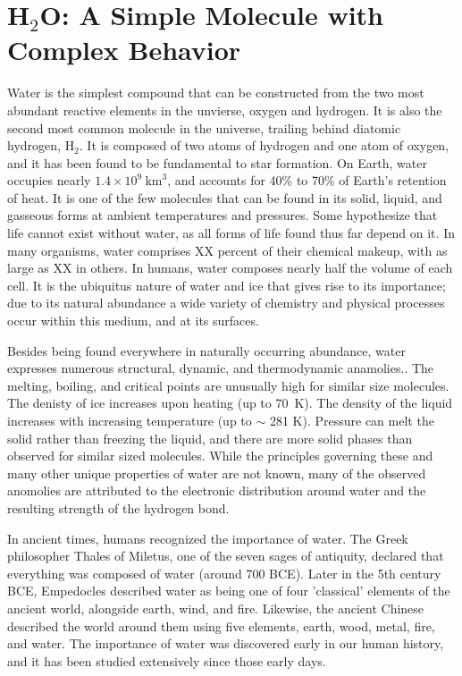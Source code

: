 \section{H$_2$O: A Simple Molecule with Complex Behavior}
Water is the simplest compound that can be constructed from the two
most abundant reactive elements in the unvierse, oxygen and
hydrogen. It is also the second most common molecule in the universe,
trailing behind diatomic hydrogen, $\mathrm{H}_2$. It is composed of
two atoms of hydrogen and one atom of oxygen, and it has been found to
be fundamental to star formation.  On Earth, water occupies nearly
$1.4\times 10^{9}~\mathrm{km}^{3}$\cite{Brown2016}, and accounts for 40\% to
70\% of Earth's retention of heat. It is one of the few molecules that
can be found in its solid, liquid, and gasseous forms at ambient
temperatures and pressures.  Some hypothesize that life cannot exist
without water, as all forms of life found thus far depend on
it.\cite{Caldecott2008,Henry2005} In many organisms, water comprises
XX percent of their chemical makeup, with as large as XX in others. In
humans, water composes nearly half the volume of each
cell.\cite{Ling2004} It is the ubiquitus nature of water and ice that
gives rise to its importance; due to its natural abundance a wide
variety of chemistry and physical processes occur within this medium,
and at its surfaces.

Besides being found everywhere in naturally occurring abundance, water
expresses numerous structural, dynamic, and thermodynamic
anamolies.\cite{Brovchenko2008}. The melting, boiling, and critical
points are unusually high for similar size molecules. The denisty of
ice increases upon heating (up to 70~K). The density of the liquid
increases with increasing temperature (up to $\sim$ 281 K). Pressure
can melt the solid rather than freezing the liquid, and there are more
solid phases than observed for similar sized molecules. While the
principles governing these and many other unique properties of water
are not known, many of the observed anomolies are attributed to the
electronic distribution around water and the resulting strength of the
hydrogen bond.

In ancient times, humans recognized the importance of water. The Greek
philosopher Thales of Miletus, one of the seven sages of antiquity,
declared that everything was composed of water (around 700 BCE). Later
in the 5th century BCE, Empedocles described water as being one of
four 'classical' elements of the ancient world, alongside earth, wind,
and fire. Likewise, the ancient Chinese described the world around them
using five elements, earth, wood, metal, fire, and water. The
importance of water was discovered early in our human history, and it
has been studied extensively since those early days.

